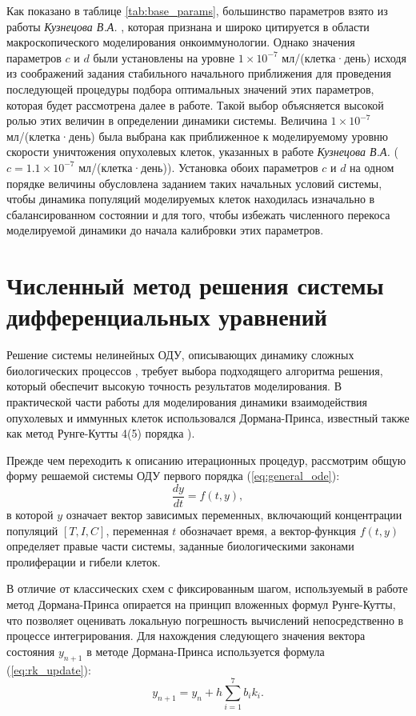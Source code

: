 Как показано в таблице \ref{tab:base_params}, большинство параметров
взято из работы \textit{Кузнецова В.А.} \cite{Kuznetsov1994}, которая
признана и широко цитируется в области макроскопического моделирования
онкоиммунологии. Однако значения параметров $c$ и $d$ были установлены на
уровне $1 \times 10^{-7}$ мл/(клетка·день) исходя из соображений задания
стабильного начального приближения для проведения последующей процедуры подбора
оптимальных значений этих параметров, которая будет рассмотрена далее в работе.
Такой выбор объясняется высокой ролью этих величин в определении динамики системы.
Величина $1 \times 10^{-7}$ мл/(клетка·день) была выбрана как приближенное к
моделируемому уровню скорости уничтожения опухолевых клеток, указанных в работе
\textit{Кузнецова В.А.} \cite{Kuznetsov1994} ($c = 1.1 \times 10^{-7}$ мл/(клетка·день)).
Установка обоих параметров $c$ и $d$ на одном порядке величины обусловлена
заданием таких начальных условий системы, чтобы динамика популяций моделируемых
клеток находилась изначально в сбалансированном состоянии и для того, чтобы
избежать численного перекоса моделируемой динамики до начала калибровки этих параметров.

\section{Численный метод решения системы дифференциальных уравнений}

Решение системы нелинейных ОДУ, описывающих динамику сложных биологических
процессов \cite{nonlinear_dynamics}, требует выбора подходящего алгоритма
решения, который обеспечит высокую точность результатов моделирования.
В практической части работы для моделирования динамики взаимодействия
опухолевых и иммунных клеток использовался Дормана-Принса, известный также как метод
Рунге-Кутты 4(5) порядка \cite{yang_runge_kutta}).

Прежде чем переходить к описанию итерационных процедур, рассмотрим общую форму
решаемой системы ОДУ первого порядка (\ref{eq:general_ode}):
\begin{equation}
\label{eq:general_ode}
\frac{dy}{dt} = f(t, y),
\end{equation}
в которой $y$ означает вектор зависимых переменных, включающий концентрации
популяций $[T, I, C]$, переменная $t$ обозначает время, а вектор-функция $f(t,
y)$ определяет правые части системы, заданные биологическими законами
пролиферации и гибели клеток.

В отличие от классических схем с фиксированным шагом, используемый в работе
метод Дормана-Принса опирается на принцип вложенных формул Рунге-Кутты, что позволяет
оценивать локальную погрешность вычислений непосредственно в процессе
интегрирования. Для нахождения следующего значения вектора состояния $y_{n+1}$
в методе Дормана-Принса используется формула (\ref{eq:rk_update}):
\begin{equation}
\label{eq:rk_update}
y_{n+1} = y_n + h \sum_{i=1}^{7} b_i k_i.
\end{equation}

